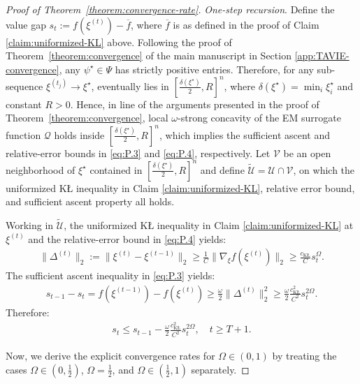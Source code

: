 \documentclass[12pt]{article}
\numberwithin{equation}{section}
\begin{document}
\begin{proof}[Proof of Theorem~\ref{theorem:convergence-rate}]
\noindent
\emph{One-step recursion}.
Define the value gap $s_t:= f(\xi^{(t)}) - \overline{f}$, where $\overline{f}$ is as defined in the proof of Claim \ref{claim:uniformized-KL} above.
Following the proof of Theorem~\ref{theorem:convergence} of the main manuscript in Section \ref{app:TAVIE-convergence}, any $\psi^{\star}\in \Psi$ has strictly positive entries. Therefore, for any sub-sequence $\xi^{(t_j)} \to \xi^{\star}$, eventually lies in $\left[\tfrac{\delta(\xi^{\star})}{2}, R\right]^{n}$, where $\delta(\xi^{\star}) = \min_{i}\xi_i^{\star}$ and constant $R > 0$. Hence, in line of the arguments presented in the proof of Theorem~\ref{theorem:convergence}, local $\omega$-strong concavity of the EM surrogate function $\mathcal{Q}$ holds inside $\left[\tfrac{\delta(\xi^{\star})}{2}, R\right]^{n}$, which implies the sufficient ascent and relative-error bounds in \eqref{eq:P.3} and \eqref{eq:P.4}, respectively.
Let $\mathcal{V}$ be an open neighborhood of $\xi^{\star}$ contained in $\left[\tfrac{\delta(\xi^{\star})}{2}, R\right]^{n}$ and define $\tilde{\mathcal{U}} = \mathcal{U} \cap \mathcal{V}$, on which the uniformized K\L{} inequality in Claim \ref{claim:uniformized-KL}, relative error bound, and sufficient ascent property all holds.

Working in $\tilde{\mathcal{U}}$, the uniformized K\L{} inequality in Claim \ref{claim:uniformized-KL} at $\xi^{(t)}$ and the relative-error bound in \eqref{eq:P.4} yields:
\begin{align}\label{eq:UKL-13}
    \lVert \Delta^{(t)}\rVert_2:= \lVert \xi^{(t)} - \xi^{(t-1)}\rVert_2 \geq \frac{1}{C}\lVert \nabla_{\xi} f(\xi^{(t)})\rVert_2 \geq \frac{c_{\mathrm{K\text{\L}}}}{C}s_t^{\Omega}.
\end{align}
The sufficient ascent inequality in \eqref{eq:P.3} yields:
\begin{align}\label{eq:UKL-14}
    s_{t-1}-s_t = f(\xi^{(t-1)}) - f(\xi^{(t)}) \geq \frac{\omega}{2}\lVert\Delta^{(t)}\rVert_{2}^{2} \geq \frac{\omega}{2}\frac{c_{\mathrm{K\text{\L}}}^{2}}{C^2}s_t^{2\Omega}.
\end{align}
Therefore:
\begin{align}\label{eq:UKL-15}
    s_t \leq s_{t-1} - \frac{\omega}{2}\frac{c_{\mathrm{K\text{\L}}}^{2}}{C^2}s_t^{2\Omega},\quad t\geq T+1.
\end{align}

Now, we derive the explicit convergence rates for $\Omega \in (0, 1)$ by treating the cases $\Omega \in (0, \tfrac{1}{2})$, $\Omega = \tfrac{1}{2}$, and $\Omega \in (\tfrac{1}{2}, 1)$ separately.


\end{proof}
\end{document}

